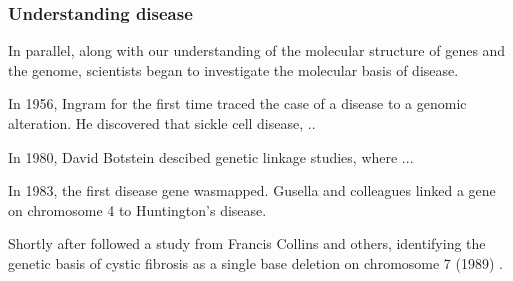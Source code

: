 






\subsubsection{Understanding disease}

In parallel, along with our understanding of the molecular structure of genes and the genome, scientists began to investigate the molecular basis of disease.



In 1956, Ingram for the first time traced the case of a disease to a genomic alteration.
He discovered that sickle cell disease, ..



In 1980, David Botstein descibed genetic linkage studies, where ... \cite{botstein1980construction}

In 1983, the first disease gene  wasmapped.
Gusella and colleagues linked a gene on chromosome 4 to Huntington's disease. \cite{gusella1983polymorphic}

Shortly after followed a study from Francis Collins and others, identifying the genetic basis of cystic fibrosis as a single base deletion on chromosome 7 (1989)  \cite{riordan1989identification}.

